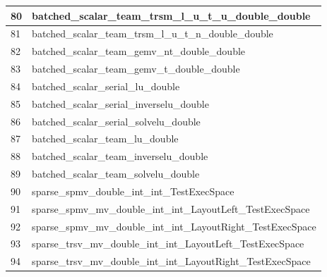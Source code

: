 \begin{table}[!htbp]
{\begin{tabular}{|>{\columncolor[HTML]{34FF34}}l |l|}
            \cellcolor[HTML]{FF00FF}80 & batched\_scalar\_team\_trsm\_l\_u\_t\_u\_double\_double             \\ \hline
            \cellcolor[HTML]{FF00FF}81 & batched\_scalar\_team\_trsm\_l\_u\_t\_n\_double\_double             \\ \hline
            82                         & batched\_scalar\_team\_gemv\_nt\_double\_double                     \\ \hline
            83                         & batched\_scalar\_team\_gemv\_t\_double\_double                      \\ \hline
            \cellcolor[HTML]{F8FF00}84 & batched\_scalar\_serial\_lu\_double                                 \\ \hline
            \cellcolor[HTML]{FF00FF}85 & batched\_scalar\_serial\_inverselu\_double                          \\ \hline
            \cellcolor[HTML]{FF00FF}86 & batched\_scalar\_serial\_solvelu\_double                            \\ \hline
            \cellcolor[HTML]{D1B3FF}87 & batched\_scalar\_team\_lu\_double                                   \\ \hline
            \cellcolor[HTML]{FF00FF}88 & batched\_scalar\_team\_inverselu\_double                            \\ \hline
            \cellcolor[HTML]{FF00FF}89 & batched\_scalar\_team\_solvelu\_double                              \\ \hline
            \cellcolor[HTML]{0000FF}90 & sparse\_spmv\_double\_int\_int\_TestExecSpace                            \\ \hline
	        \cellcolor[HTML]{0000FF}91 & sparse\_spmv\_mv\_double\_int\_int\_LayoutLeft\_TestExecSpace              \\ \hline
	        \cellcolor[HTML]{0000FF}92 & sparse\_spmv\_mv\_double\_int\_int\_LayoutRight\_TestExecSpace             \\ \hline
	        \cellcolor[HTML]{0000FF}93 & sparse\_trsv\_mv\_double\_int\_int\_LayoutLeft\_TestExecSpace              \\ \hline
	        \cellcolor[HTML]{0000FF}94 & sparse\_trsv\_mv\_double\_int\_int\_LayoutRight\_TestExecSpace             \\ \hline 
	\end{tabular}}
      \label{tab:kokkos_tests}
   \end{table}


